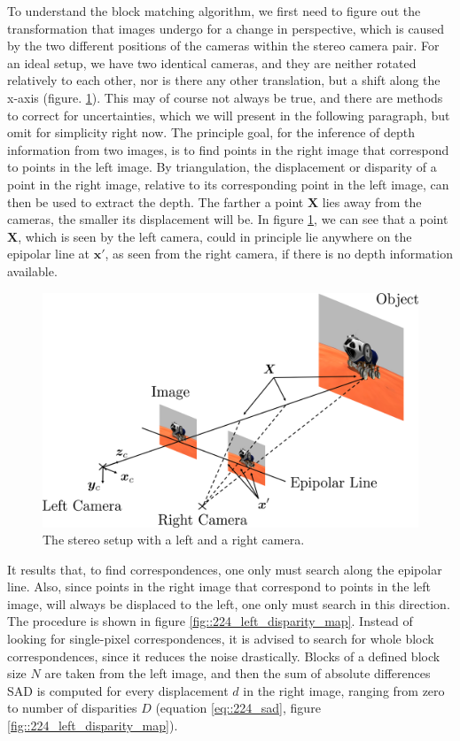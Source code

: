 To understand the block matching algorithm, we first need to figure out the transformation that images undergo for a change in perspective, which is caused by the two different positions of the cameras within the stereo camera pair. For an ideal setup, we have two identical cameras, and they are neither rotated relatively to each other, nor is there any other translation, but a shift along the x-axis (figure. \ref{fig::224_stereo_camera}). This may of course not always be true, and there are methods to correct for uncertainties, which we will present in the following paragraph, but omit for simplicity right now. The principle goal, for the inference of depth information from two images, is to find points in the right image that correspond to points in the left image. By triangulation, the displacement or disparity of a point in the right image, relative to its corresponding point in the left image, can then be used to extract the depth. The farther a point $\bm{X}$ lies away from the cameras, the smaller its displacement will be. In figure \ref{fig::224_stereo_camera}, we can see that a point $\bm{X}$, which is seen by the left camera, could in principle lie anywhere on the epipolar line at $\bm{x}'$, as seen from the right camera, if there is no depth information available. 
\begin{figure}[h!]
	\centering
	\includegraphics[scale=.28]{chapters/03_principles_of_machine_learning/img/stereo_camera.png}
	\caption{The stereo setup with a left and a right camera.}
	\label{fig::224_stereo_camera}
\end{figure}
It results that, to find correspondences, one only must search along the epipolar line. Also, since points in the right image that correspond to points in the left image, will always be displaced to the left, one only must search in this direction. The procedure is shown in figure \ref{fig::224_left_disparity_map}. Instead of looking for single-pixel correspondences, it is advised to search for whole block correspondences, since it reduces the noise drastically. Blocks of a defined block size $N$ are taken from the left image, and then the sum of absolute differences SAD is computed for every displacement $d$ in the right image, ranging from zero to number of disparities $D$ (equation \ref{eq::224_sad}, figure \ref{fig::224_left_disparity_map}).
